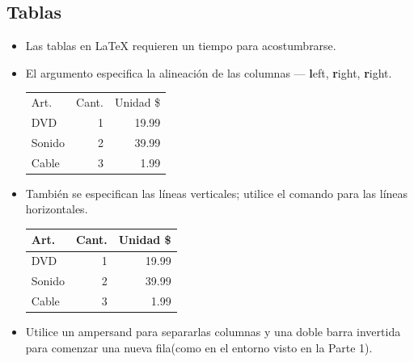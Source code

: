 \documentclass{beamer}
\begin{document}
\subsection{Tablas}
\begin{frame}[fragile]{\insertsubsection}
  \begin{itemize}
  \item Las tablas en \LaTeX{} requieren un tiempo para acostumbrarse.
  \item El argumento especifica la alineación de las columnas ---
\textbf{l}eft, \textbf{r}ight, \textbf{r}ight.
    \begin{exampletwouptiny}
\begin{tabular}{lrr}
  Art.   & Cant. & Unidad \$ \\
  DVD    & 1     & 19.99    \\
  Sonido & 2     & 39.99    \\
  Cable  & 3     & 1.99     \\
\end{tabular}
    \end{exampletwouptiny}
  \item También se especifican las líneas verticales; utilice el
comando  para las líneas horizontales.
    \begin{exampletwouptiny}
\begin{tabular}{|l|r|r|}       \hline
  Art.   & Cant. & Unidad \$ \\\hline
  DVD    & 1     & 19.99  \\
  Sonido & 2     & 39.99  \\
  Cable  & 3     & 1.99   \\  \hline
\end{tabular}
    \end{exampletwouptiny}
  \item Utilice un ampersand \keystrokebftt{\&} para separarlas
columnas y una doble barra invertida
\keystrokebftt{\bs}\keystrokebftt{\bs} para comenzar una nueva
fila(como en el entorno  visto en la Parte 1).
  \end{itemize}
\end{frame}
\end{document}
